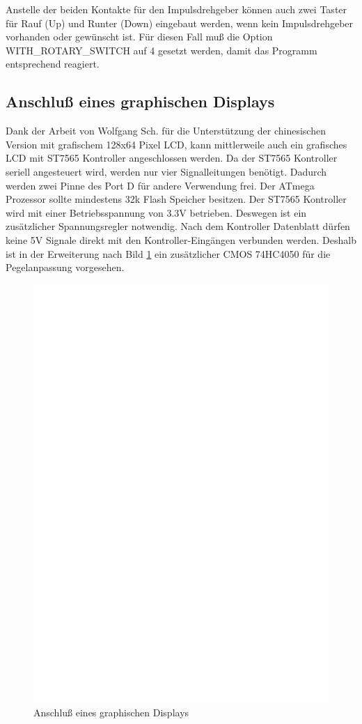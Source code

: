 Anstelle der beiden Kontakte für den Impulsdrehgeber können auch zwei Taster für Rauf (Up)  und Runter (Down)
eingebaut werden, wenn kein Impulsdrehgeber vorhanden oder gewünscht ist.
Für diesen Fall muß die Option WITH\_ROTARY\_SWITCH auf 4 gesetzt werden, damit das Programm
entsprechend reagiert.

\subsection{Anschluß eines graphischen Displays}

Dank der Arbeit von Wolfgang Sch. für die Unterstützung der chinesischen Version mit
grafischem 128x64 Pixel LCD, kann mittlerweile auch ein grafisches LCD
mit ST7565 Kontroller angeschlossen werden. Da der ST7565 Kontroller seriell angesteuert wird,
werden nur vier Signalleitungen benötigt.
Dadurch werden zwei Pinne des Port D für andere Verwendung frei.
Der ATmega Prozessor sollte mindestens 32k Flash Speicher besitzen.
Der ST7565 Kontroller wird mit einer Betriebsspannung von 3.3V betrieben.
Deswegen ist ein zusätzlicher Spannungsregler notwendig.
Nach dem Kontroller Datenblatt dürfen keine 5V Signale direkt mit den Kontroller-Eingängen verbunden
werden. Deshalb ist in der Erweiterung nach Bild \ref{fig:ST7565lcd} ein zusätzlicher CMOS 74HC4050
für die Pegelanpassung vorgesehen. 
 
\begin{figure}[H]
\centering
\includegraphics[width=14cm]{../FIG/ST7565lcd.eps}
\caption{Anschluß eines graphischen Displays}
\label{fig:ST7565lcd}
\end{figure}

